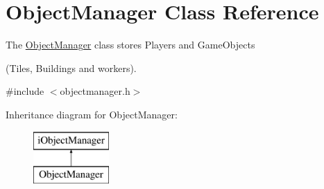 \hypertarget{classObjectManager}{\section{Object\-Manager Class Reference}
\label{classObjectManager}
}


The \hyperlink{classObjectManager}{Object\-Manager} class stores Players and Game\-Objects \par
(Tiles, Buildings and workers).  




{\ttfamily \#include $<$objectmanager.\-h$>$}

Inheritance diagram for Object\-Manager\-:\begin{figure}[H]
\begin{center}
\leavevmode
\includegraphics[height=2.000000cm]{classObjectManager}
\end{center}
\end{figure}
